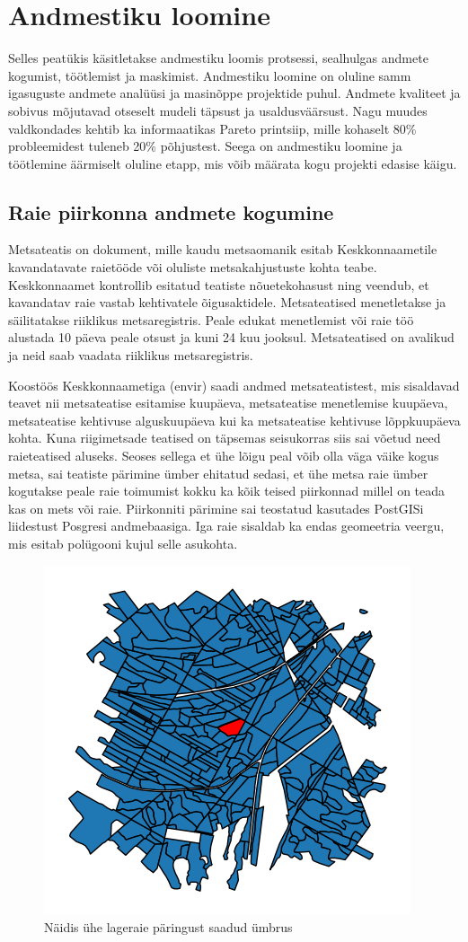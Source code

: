 \section{Andmestiku loomine}
Selles peatükis käsitletakse andmestiku loomis protsessi, sealhulgas andmete kogumist, töötlemist ja maskimist. Andmestiku loomine on oluline samm igasuguste andmete analüüsi ja masinõppe projektide puhul. Andmete kvaliteet ja sobivus mõjutavad otseselt mudeli täpsust ja usaldusväärsust. Nagu muudes valdkondades kehtib ka informaatikas Pareto printsiip, mille kohaselt 80\% probleemidest tuleneb 20\% põhjustest. Seega on andmestiku loomine ja töötlemine äärmiselt oluline etapp, mis võib määrata kogu projekti edasise käigu.

\subsection{Raie piirkonna andmete kogumine}
Metsateatis on dokument, mille kaudu metsaomanik esitab Keskkonnaametile
kavandatavate raietööde või oluliste metsakahjustuste kohta teabe. Keskkonnaamet
kontrollib esitatud teatiste nõuetekohasust ning veendub, et kavandatav raie
vastab kehtivatele õigusaktidele. Metsateatised menetletakse ja säilitatakse
riiklikus metsaregistris. Peale edukat menetlemist või raie töö alustada 10 päeva peale otsust ja kuni 24 kuu jooksul. \cite{MetsateatisJaMetsaregister} Metsateatised on avalikud ja neid saab vaadata riiklikus metsaregistris.

Koostöös Keskkonnaametiga (envir) saadi andmed metsateatistest, mis sisaldavad teavet nii metsateatise esitamise kuupäeva, metsateatise menetlemise kuupäeva, metsateatise kehtivuse alguskuupäeva kui ka metsateatise kehtivuse lõppkuupäeva kohta. Kuna riigimetsade teatised on täpsemas seisukorras siis sai võetud need raieteatised aluseks. Seoses sellega et ühe lõigu peal võib olla väga väike kogus metsa, sai teatiste pärimine ümber ehitatud sedasi, et ühe metsa raie ümber kogutakse peale raie toimumist kokku ka kõik teised piirkonnad millel on teada kas on mets või raie. Piirkonniti pärimine sai teostatud kasutades PostGISi liidestust Posgresi andmebaasiga. Iga raie sisaldab ka endas geomeetria veergu, mis esitab polügooni kujul selle asukohta. 

\begin{figure}[hb]
    \centering
    \includegraphics[width=.5\textwidth]{figures/andmestik/er_id_is10124223.png}
    \caption{Näidis ühe lageraie päringust saadud ümbrus}
    \label{fig:umbrusexample}
\end{figure}

